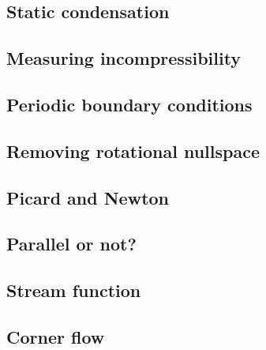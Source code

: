 \documentclass[a4paper]{article}
\begin{document}
\subsection{Static condensation}  %
\newpage %
\subsection{Measuring incompressibility \label{ss_incomp}}  %
\newpage %
\subsection{Periodic boundary conditions\label{ss_periodic}} %
\newpage %
\subsection{Removing rotational nullspace\label{ss_nullspace}}  %
\newpage %
\subsection{Picard and Newton \label{ss_nonlinear}}  %
\newpage %
\subsection{Parallel or not?} \label{sec:parallel}  %
\newpage %
\subsection{Stream function} \label{sec:streamfunction}  %
\newpage %
\subsection{Corner flow} \label{sec:cornerflow}  %
\newpage %
\end{document}
